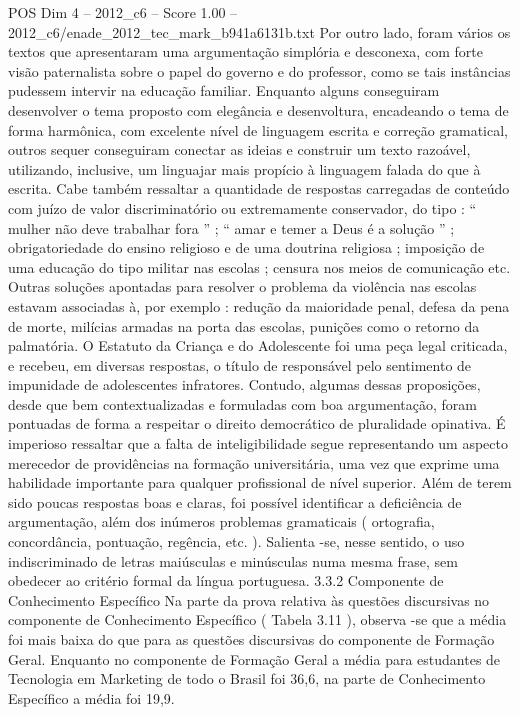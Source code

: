 \begin{textsample}{POS Dim 4 – 2012\_c6 – Score 1.00 – 2012\_c6/enade\_2012\_tec\_mark\_b941a6131b.txt}
Por outro lado, foram vários os textos que apresentaram uma argumentação simplória e desconexa, com forte visão paternalista sobre o papel do governo e do professor, como se tais instâncias pudessem intervir na educação familiar.
Enquanto alguns conseguiram desenvolver o tema proposto com elegância e desenvoltura, encadeando o tema de forma harmônica, com excelente nível de linguagem escrita e correção gramatical, outros sequer conseguiram conectar as ideias e construir um texto razoável, utilizando, inclusive, um linguajar mais propício à linguagem falada do que à escrita.
Cabe também ressaltar a quantidade de respostas carregadas de conteúdo com juízo de valor discriminatório ou extremamente conservador, do tipo : “ mulher não deve trabalhar fora ” ; “ amar e temer a Deus é a solução ” ; obrigatoriedade do ensino religioso e de uma doutrina religiosa ; imposição de uma educação do tipo militar nas escolas ; censura nos meios de comunicação etc.
Outras soluções apontadas para resolver o problema da violência nas escolas estavam associadas à, por exemplo : redução da maioridade penal, defesa da pena de morte, milícias armadas na porta das escolas, punições como o retorno da palmatória.
O Estatuto da Criança e do Adolescente foi uma peça legal criticada, e recebeu, em diversas respostas, o título de responsável pelo sentimento de impunidade de adolescentes infratores.
Contudo, algumas dessas proposições, desde que bem contextualizadas e formuladas com boa argumentação, foram pontuadas de forma a respeitar o direito democrático de pluralidade opinativa.
É imperioso ressaltar que a falta de inteligibilidade segue representando um aspecto merecedor de providências na formação universitária, uma vez que exprime uma habilidade importante para qualquer profissional de nível superior.
Além de terem sido poucas respostas boas e claras, foi possível identificar a deficiência de argumentação, além dos inúmeros problemas gramaticais ( ortografia, concordância, pontuação, regência, etc. ).
Salienta -se, nesse sentido, o uso indiscriminado de letras maiúsculas e minúsculas numa mesma frase, sem obedecer ao critério formal da língua portuguesa. 3.3.2 Componente de Conhecimento Específico Na parte da prova relativa às questões discursivas no componente de Conhecimento Específico ( Tabela 3.11 ), observa -se que a média foi mais baixa do que para as questões discursivas do componente de Formação Geral.
Enquanto no componente de Formação Geral a média para estudantes de Tecnologia em Marketing de todo o Brasil foi 36,6, na parte de Conhecimento Específico a média foi 19,9.

\end{textsample}
